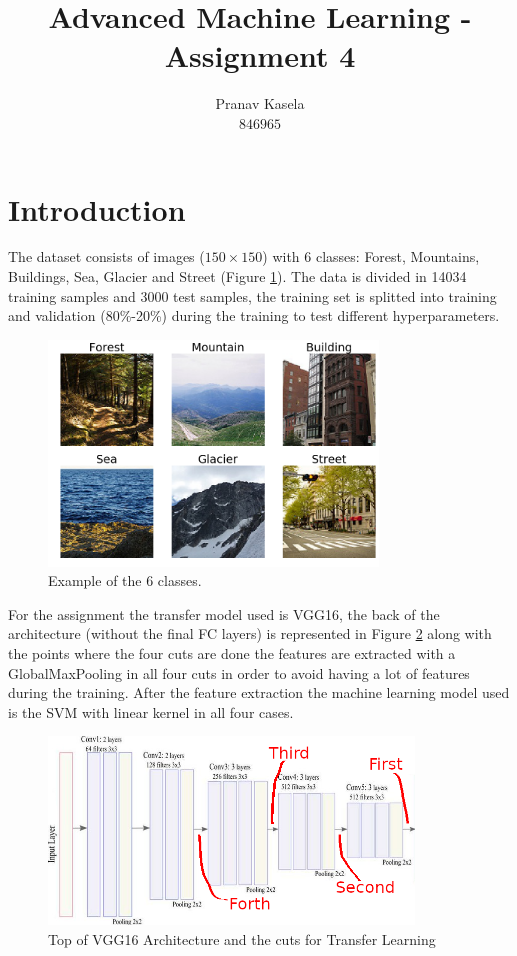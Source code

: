 \documentclass[11pt]{article}
\title{Advanced Machine Learning - Assignment 4}
\author{Pranav Kasela \\$846965$}
\date{}
\begin{document}
\maketitle

\section*{Introduction}
The dataset consists of images ($150\times150$) with 6 classes: Forest, Mountains, Buildings, Sea, Glacier and Street (Figure \ref{fig:example}). The data is divided in 14034 training samples and 3000 test samples, the training set is splitted into training and validation (80\%-20\%) during the training to test different hyperparameters.
\begin{figure}[!h]
  \centering
  \includegraphics[width=\linewidth, height=6cm]{imgs/samples.png}
  \caption{Example of the 6 classes.}
  \label{fig:example}
\end{figure}

For the assignment the transfer model used is VGG16, the back of the architecture (without the final FC layers) is represented in Figure \ref{fig:VGG16} along with the points where the four cuts are done the features are extracted with a GlobalMaxPooling in all four cuts in order to avoid having a lot of features during the training.
After the feature extraction the machine learning model used is the SVM with linear kernel in all four cases.
\begin{figure}[!h]
  \centering
  \includegraphics[width=\linewidth, height=5cm]{imgs/VGG16.png}
  \caption{Top of VGG16 Architecture and the cuts for Transfer Learning}
  \label{fig:VGG16}
\end{figure}
\end{document}

